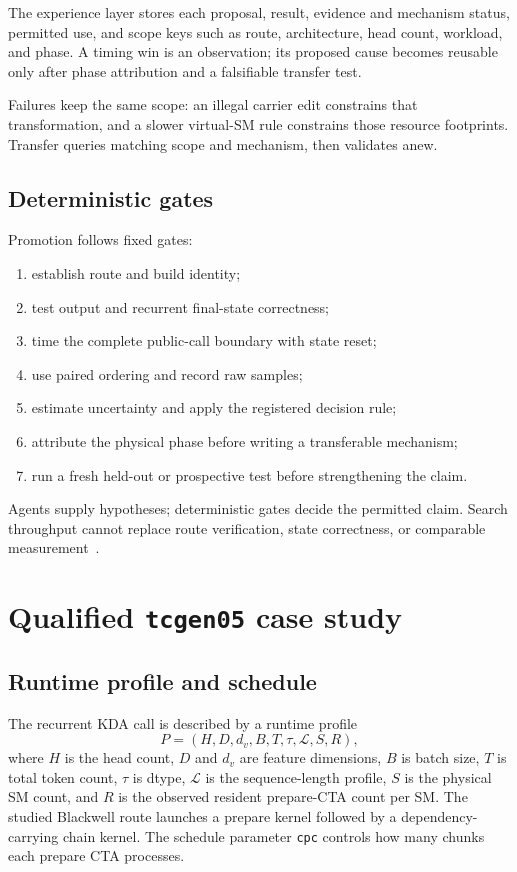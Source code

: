 \documentclass[11pt]{article}
\newcommand{\tcgen}{\texttt{tcgen05}}
\newcommand{\cpc}{\texttt{cpc}}
\begin{document}
The experience layer stores each proposal, result, evidence and mechanism status, permitted use, and scope keys such as route, architecture, head count, workload, and phase. A timing win is an observation; its proposed cause becomes reusable only after phase attribution and a falsifiable transfer test.

Failures keep the same scope: an illegal carrier edit constrains that transformation, and a slower virtual-SM rule constrains those resource footprints. Transfer queries matching scope and mechanism, then validates anew.

\subsection{Deterministic gates}

Promotion follows fixed gates:
\begin{enumerate}
  \item establish route and build identity;
  \item test output and recurrent final-state correctness;
  \item time the complete public-call boundary with state reset;
  \item use paired ordering and record raw samples;
  \item estimate uncertainty and apply the registered decision rule;
  \item attribute the physical phase before writing a transferable mechanism;
  \item run a fresh held-out or prospective test before strengthening the claim.
\end{enumerate}
Agents supply hypotheses; deterministic gates decide the permitted claim. Search throughput cannot replace route verification, state correctness, or comparable measurement~\citep{kernelbench2025,asi2024,astra2025,kernelagent2026,kernelarc2026,kernelbenchverified2026}.

\section{Qualified \tcgen{} case study}

\subsection{Runtime profile and schedule}

The recurrent KDA call is described by a runtime profile
\[
P=(H,D,d_v,B,T,\tau,\mathcal{L},S,R),
\]
where $H$ is the head count, $D$ and $d_v$ are feature dimensions, $B$ is batch size, $T$ is total token count, $\tau$ is dtype, $\mathcal{L}$ is the sequence-length profile, $S$ is the physical SM count, and $R$ is the observed resident prepare-CTA count per SM. The studied Blackwell route launches a prepare kernel followed by a dependency-carrying chain kernel. The schedule parameter \cpc{} controls how many chunks each prepare CTA processes.
\end{document}
